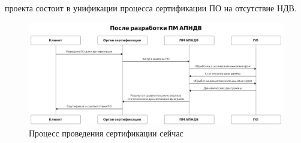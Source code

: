 
{\influence} проекта состоит в унификации процесса сертификации ПО на отсутствие НДВ.

\begin{figure}[!htbp]
    \includegraphics[width=\textwidth,height=\textheight,keepaspectratio]{images/uml_after_cropped.png}
    \caption{Процесс проведения сертификации сейчас\label{fig:how-cert-is-now}}
\end{figure}



